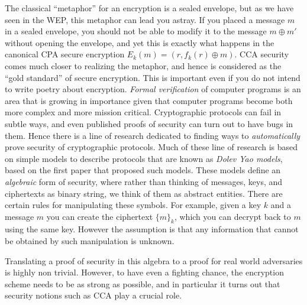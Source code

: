 The classical ``metaphor'' for an encryption is a sealed envelope, but
as we have seen in the WEP, this metaphor can lead you astray. If you
placed a message \(m\) in a sealed envelope, you should not be able to
modify it to the message \(m \oplus m'\) without opening the envelope,
and yet this is exactly what happens in the canonical CPA secure
encryption \(E_k(m)=(r,f_k(r) \oplus m)\). CCA security comes much
closer to realizing the metaphor, and hence is considered as the ``gold
standard'' of secure encryption. This is important even if you do not
intend to write poetry about encryption. \emph{Formal verification} of
computer programs is an area that is growing in importance given that
computer programs become both more complex and more mission critical.
Cryptographic protocols can fail in subtle ways, and even published
proofs of security can turn out to have bugs in them. Hence there is a
line of research dedicated to finding ways to \emph{automatically} prove
security of cryptographic protocols. Much of these line of research is
based on simple models to describe protocols that are known as
\emph{Dolev Yao models}, based on the first paper that proposed such
models. These models define an \emph{algebraic} form of security, where
rather than thinking of messages, keys, and ciphertexts as binary
string, we think of them as abstract entities. There are certain rules
for manipulating these symbols. For example, given a key \(k\) and a
message \(m\) you can create the ciphertext \(\{ m \}_k\), which you can
decrypt back to \(m\) using the same key. However the assumption is that
any information that cannot be obtained by such manipulation is unknown.

Translating a proof of security in this algebra to a proof for real
world adversaries is highly non trivial. However, to have even a
fighting chance, the encryption scheme needs to be as strong as
possible, and in particular it turns out that security notions such as
CCA play a crucial role.
